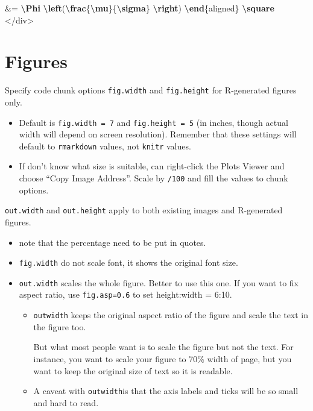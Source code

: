 \documentclass[
  a4paper,
  twoside,
  openright]{book}
\newenvironment{Shaded}{\begin{snugshade}}{\end{snugshade}}
\newcommand{\ExtensionTok}[1]{#1}
\newcommand{\KeywordTok}[1]{\textcolor[rgb]{0.13,0.29,0.53}{\textbf{#1}}}
\newcommand{\NormalTok}[1]{#1}
\newcommand{\SpecialCharTok}[1]{\textcolor[rgb]{0.81,0.36,0.00}{\textbf{#1}}}
\newcommand{\SpecialStringTok}[1]{\textcolor[rgb]{0.31,0.60,0.02}{#1}}
\providecommand{\tightlist}{%
  \setlength{\itemsep}{0pt}\setlength{\parskip}{0pt}}
\theoremstyle{definition}
\theoremstyle{definition}
\theoremstyle{definition}
\theoremstyle{definition}
\theoremstyle{remark}
\begin{document}
\begin{Shaded}
\begin{Highlighting}[]
\SpecialStringTok{\&= }\SpecialCharTok{\textbackslash{}Phi}\SpecialStringTok{ }\SpecialCharTok{\textbackslash{}left}\SpecialStringTok{(}\SpecialCharTok{\textbackslash{}frac}\SpecialStringTok{\{}\SpecialCharTok{\textbackslash{}mu}\SpecialStringTok{\}\{}\SpecialCharTok{\textbackslash{}sigma}\SpecialStringTok{\} }\SpecialCharTok{\textbackslash{}right}\SpecialStringTok{) }
\KeywordTok{\textbackslash{}end}\NormalTok{\{}\ExtensionTok{aligned}\NormalTok{\}}\SpecialStringTok{  }\SpecialCharTok{\textbackslash{}square}
\SpecialStringTok{$$}
\NormalTok{\textasciigrave{}\textasciigrave{}\textasciigrave{}}
\NormalTok{\textless{}/div\textgreater{}}
\end{Highlighting}
\end{Shaded}

\section{Figures}\label{figures}

Specify code chunk options \texttt{fig.width} and \texttt{fig.height} for R-generated figures only.

\begin{itemize}
\tightlist
\item
  Default is \texttt{fig.width\ =\ 7} and \texttt{fig.height\ =\ 5} (in inches, though actual width will depend on screen resolution). Remember that these settings will default to \texttt{rmarkdown} values, not \texttt{knitr} values.
\item
  If don't know what size is suitable, can right-click the Plots Viewer and choose ``Copy Image Address''. Scale by \texttt{/100} and fill the values to chunk options.
\end{itemize}

\texttt{out.width} and \texttt{out.height} apply to both existing images and R-generated figures.

\begin{itemize}
\item
  note that the percentage need to be put in quotes.
\item
  \texttt{fig.width} do not scale font, it shows the original font size.
\item
  \texttt{out.width} scales the whole figure. Better to use this one. If you want to fix aspect ratio, use \texttt{fig.asp=0.6} to set height:width = 6:10.

  \begin{itemize}
  \item
    \texttt{outwidth} keeps the original aspect ratio of the figure and scale the text in the figure too.

    But what most people want is to scale the figure but not the text. For instance, you want to scale your figure to 70\% width of page, but you want to keep the original size of text so it is readable.
  \item
    A caveat with \texttt{outwidth}is that the {axis labels and ticks will be so small} and hard to read.
  \end{itemize}
\end{itemize}
\end{document}
